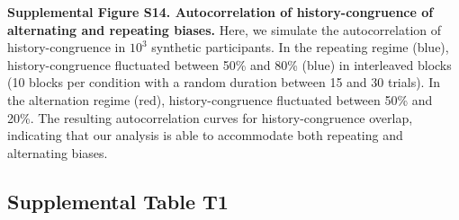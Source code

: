 \documentclass[
]{article}
\begin{document}
\textbf{Supplemental Figure S14. Autocorrelation of history-congruence
of alternating and repeating biases.} Here, we simulate the
autocorrelation of history-congruence in \(\ensuremath{10^{3}}\)
synthetic participants. In the repeating regime (blue),
history-congruence fluctuated between 50\% and 80\% (blue) in
interleaved blocks (10 blocks per condition with a random duration
between 15 and 30 trials). In the alternation regime (red),
history-congruence fluctuated between 50\% and 20\%. The resulting
autocorrelation curves for history-congruence overlap, indicating that
our analysis is able to accommodate both repeating and alternating
biases.

\newpage

\hypertarget{supplemental-table-t1}{%
\subsection{Supplemental Table T1}\label{supplemental-table-t1}}

\begingroup\fontsize{7}{9}\selectfont
\end{document}
